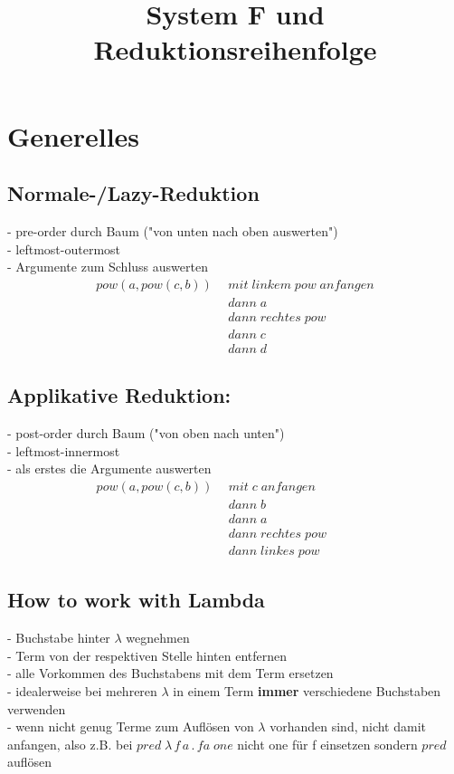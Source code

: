 \documentclass{article}
\title{System F und Reduktionsreihenfolge}
\date{ }
\begin{document}
	\section{Generelles}
		\subsection{Normale-/Lazy-Reduktion}
			- pre-order durch Baum ("von unten nach oben auswerten")	\\
			- leftmost-outermost\\
			- Argumente zum Schluss auswerten
			\begin{align*}			
				pow(a,pow(c,b))\:\:	& mit\;linkem\;pow\;anfangen\\
									& dann\;a\\
									& dann\;rechtes\;pow\\
									& dann\;c\\
									& dann\;d
			\end{align*}
		\subsection{Applikative Reduktion:}
			- post-order durch Baum ("von oben nach unten")\\
			- leftmost-innermost\\
			- als erstes die Argumente auswerten
			\begin{align*}
				pow(a,pow(c,b))\:\: & mit\;c\;anfangen
				\enspace\;\;\;\;\;\;\;\;\;\enspace\;\;\;\;
											\\
									& dann\;b\\
									& dann\;a\\
									& dann\;rechtes\;pow\\
									& dann\;linkes\;pow
			\end{align*}
		\subsection{How to work with Lambda}
			- Buchstabe hinter $\lambda $ wegnehmen\\
			- Term von der respektiven Stelle hinten entfernen\\
			- alle Vorkommen des Buchstabens mit dem Term ersetzen\\
			- idealerweise bei mehreren $\lambda$ in einem Term \textbf{immer} verschiedene Buchstaben verwenden\\
			- wenn nicht genug Terme zum Aufl\"osen von $\lambda$ vorhanden sind, nicht damit anfangen, also z.B. bei $pred\;\lambda\,f\,a\,.\,fa\;one$ nicht one f\"ur f einsetzen sondern $pred$ aufl\"osen
\end{document}
